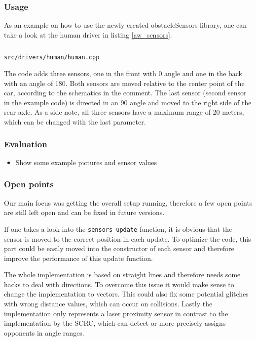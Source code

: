 \documentclass[paper=a4, fontsize=11pt]{scrreprt}
\begin{document}
\subsubsection{Usage}
As an example on how to use the newly created obstacleSensors library,
one can take a look at the human driver in listing \ref{aw_sensors}.

\begin{listing}[ht]\label{aw_sensors}
  \inputminted[firstline=245,linenos=true,lastline=256]{c++}{../../../simulators/speed-dreams/src/drivers/human/human.cpp}
  \caption{\texttt{src/drivers/human/human.cpp}}
\end{listing}

The code adds three sensors, one in the front with 0\degree{} angle
and one in the back with an angle of 180\degree{}.
Both sensors are moved relative to the center point of the car,
according to the schematics in the comment.
The last sensor (second sensor in the example code) is directed in an 90\degree{} angle
and moved to the right side of the rear axle.
As a side note, all three sensors have a maximum range of 20 meters,
which can be changed with the last parameter.

\subsubsection{Evaluation}
\begin{itemize}
  \item Show some example pictures and sensor values
\end{itemize}

\subsubsection{Open points}
Our main focus was getting the overall setup running,
therefore a few open points are still left open
and can be fixed in future versions.

If one takes a look into the \texttt{sensors\_update} function,
it is obvious that the sensor is moved to the correct position in each update.
To optimize the code, this part could be easily moved into the constructor of each sensor
and therefore improve the performance of this update function.

The whole implementation is based on straight lines
and therefore needs some hacks to deal with directions.
To overcome this issue it would make sense to change the implementation to vectors.
This could also fix some potential glitches with wrong distance values,
which can occur on collisions.
Lastly the implementation only represents a laser proximity sensor
in contrast to the implementation by the SCRC,
which can detect or more precisely assigns opponents in angle ranges.
\end{document}
